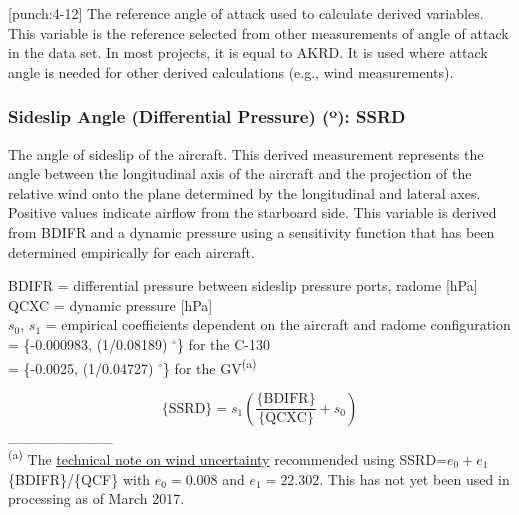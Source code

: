 \documentclass[
  english,
]{book}
\begin{document}
\protect\hypertarget{punch:4-12}{}{{[}punch:4-12{]}}
The reference angle of attack used to calculate derived variables. This variable is the reference selected from other measurements of angle of attack in the data set. In most projects, it is equal to AKRD. It is used where attack angle is needed for other derived calculations (e.g., wind measurements).

\hypertarget{ssrd}{%
\subsubsection*{\texorpdfstring{Sideslip Angle (Differential Pressure) ({º}): SSRD}{Sideslip Angle (Differential Pressure) (º): SSRD}}\label{ssrd}}

The angle of sideslip of the aircraft. This derived measurement represents the angle between the longitudinal axis of the aircraft and the projection of the relative wind onto the plane determined by the longitudinal and lateral axes. Positive values indicate airflow from the starboard side. This variable is derived from BDIFR and a dynamic pressure using a sensitivity function that has been determined empirically for each aircraft.

BDIFR = differential pressure between sideslip pressure ports, radome
{[}hPa{]}\\
QCXC = dynamic pressure {[}hPa{]}\\
\(s_{0},\,s{}_{1}\) = empirical
coefficients dependent on the aircraft and radome configuration\\
\hspace*{0.333em}\hspace*{0.333em}\hspace*{0.333em}\hspace*{0.333em}\hspace*{0.333em} = \{-0.000983, (1/0.08189) \(^\circ\)\} for the
C-130\\
\hspace*{0.333em}\hspace*{0.333em}\hspace*{0.333em}\hspace*{0.333em}\hspace*{0.333em} = \{-0.0025, (1/0.04727) \(^\circ\)\} for the GV\textsuperscript{(a)}

\begin{equation}
\mathrm{\{SSRD\}} = s_{1}(\frac{\mathrm{\{BDIFR\}}}{\{\mathrm{QCXC}\}}+s_{0})
\label{eq:SSRD}
\end{equation}
\_\_\_\_\_\_\_\_\_\_\\
\textsuperscript{(a)} The \href{http://dx.doi.org/10.5065/D60G3HJ8}{technical note on wind uncertainty}
recommended using SSRD=\(e_{0}+e_{1}\)\{BDIFR\}/\{QCF\} with \(e_{0}=0.008\)
and \(e_{1}=22.302\). This has not yet been used in processing as of
March 2017.
\end{document}
